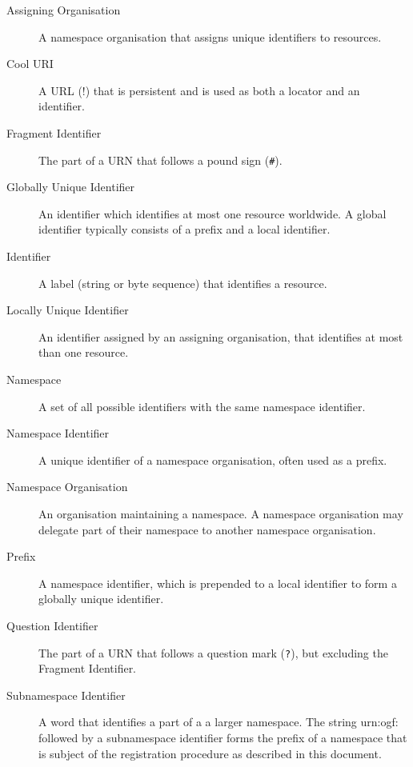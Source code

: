 \documentclass[12pt]{article}  %
\begin{document}
\begin{description}

  \item[Assigning Organisation] A namespace organisation that assigns unique 
    identifiers to resources.
  
  \item[Cool URI] A URL (!) that is persistent and is used as both a locator 
    and an identifier.

  \item[Fragment Identifier] The part of a URN that follows a pound sign 
    (\qq{}\texttt{\#}\qq{}).

  \item[Globally Unique Identifier] An identifier which identifies at most one 
    resource worldwide. A global identifier typically consists of a prefix and 
    a local identifier.

  \item[Identifier] A label (string or byte sequence) that identifies a resource.

  \item[Locally Unique Identifier] An identifier assigned by an assigning organisation, 
    that identifies at most than one resource.

  \item[Namespace] A set of all possible identifiers with the same namespace identifier.

  \item[Namespace Identifier] A unique identifier of a namespace organisation, 
    often used as a prefix.

  \item[Namespace Organisation] An organisation maintaining a namespace. 
    A namespace organisation may delegate part of their namespace to another 
    namespace organisation.

  \item[Prefix] A namespace identifier, which is prepended to a local identifier 
    to form a globally unique identifier.

  \item[Question Identifier] The part of a URN that follows a question mark 
    (\qq{}\texttt{?}\qq{}), but excluding the Fragment Identifier.

  \item[Subnamespace Identifier] A word that identifies a part of a a larger 
    namespace. The string \qq{}urn:ogf:\qq{} followed by a subnamespace identifier 
    forms the prefix of a namespace that is subject of the registration procedure 
    as described in this document.
  

\end{description}
\end{document}
